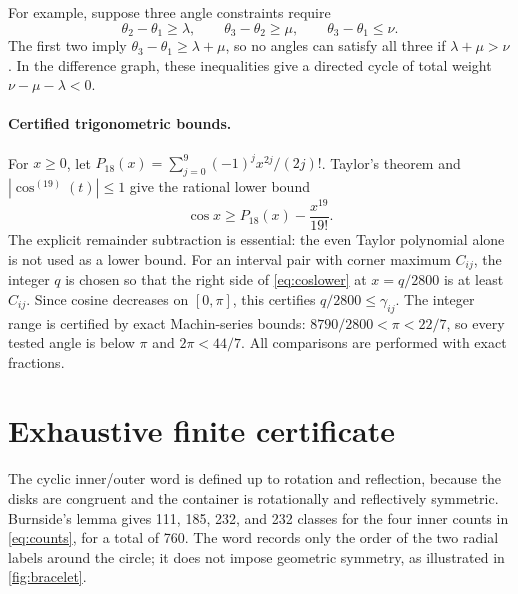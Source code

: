 \documentclass[11pt]{article}
\theoremstyle{definition}
\begin{document}
For example, suppose three angle constraints require
\[
 \theta_2-\theta_1\ge\lambda,\qquad
 \theta_3-\theta_2\ge\mu,\qquad
 \theta_3-\theta_1\le\nu.
\]
The first two imply $\theta_3-\theta_1\ge\lambda+\mu$, so no angles can satisfy all three if $\lambda+\mu>\nu$. In the difference graph, these inequalities give a directed cycle of total weight $\nu-\mu-\lambda<0$.



\paragraph{Certified trigonometric bounds.}
For $x\ge0$, let $P_{18}(x)=\sum_{j=0}^{9}(-1)^j x^{2j}/(2j)!$. Taylor's theorem and $|\cos^{(19)}(t)|\le1$ give the rational lower bound
\begin{equation}\label{eq:coslower}
 \cos x\ge P_{18}(x)-\frac{x^{19}}{19!}.
\end{equation}
The explicit remainder subtraction is essential: the even Taylor polynomial alone is not used as a lower bound. For an interval pair with corner maximum $C_{ij}$, the integer $q$ is chosen so that the right side of \eqref{eq:coslower} at $x=q/2800$ is at least $C_{ij}$. Since cosine decreases on $[0,\pi]$, this certifies $q/2800\le\gamma_{ij}$. The integer range is certified by exact Machin-series bounds: \(8790/2800<\pi<22/7\), so every tested angle is below $\pi$ and $2\pi<44/7$. All comparisons are performed with exact fractions.

\section{Exhaustive finite certificate}\label{sec:certificate}

The cyclic inner/outer word is defined up to rotation and reflection, because the disks are congruent and the container is rotationally and reflectively symmetric. Burnside's lemma gives 111, 185, 232, and 232 classes for the four inner counts in \cref{eq:counts}, for a total of 760. The word records only the order of the two radial labels around the circle; it does not impose geometric symmetry, as illustrated in \cref{fig:bracelet}.
\end{document}
